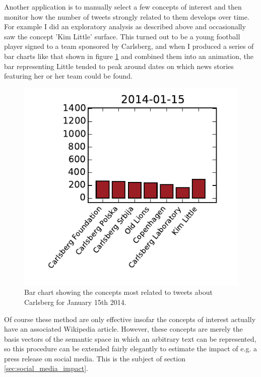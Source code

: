 Another application is to manually select a few concepts of interest and then monitor how the number of tweets strongly related to them develops over time. For example I did an exploratory analysis as described above and occasionally saw the concept 'Kim Little' surface. This turned out to be a young football player signed to a team sponsored by Carlsberg, and when I produced a series of bar charts like that shown in figure \ref{fig:kim_little} and combined them into an animation, the bar representing Little tended to peak around dates on which news stories featuring her or her team could be found.
\begin{figure}
	\centering
	\includegraphics[width=\figwidth]{pics/esa/kim_little.pdf}
	\caption{Bar chart showing the concepts most related to tweets about Carlsberg for January 15th 2014.}
	\label{fig:kim_little}
\end{figure}
Of course these method are only effective insofar the concepts of interest actually have an associated Wikipedia article. However, these concepts are merely the basis vectors of the semantic space in which an arbitrary text can be represented, so this procedure can be extended fairly elegantly to estimate the impact of e.g. a press release on social media. This is the subject of section \ref{sec:social_media_impact}.

\FloatBarrier
